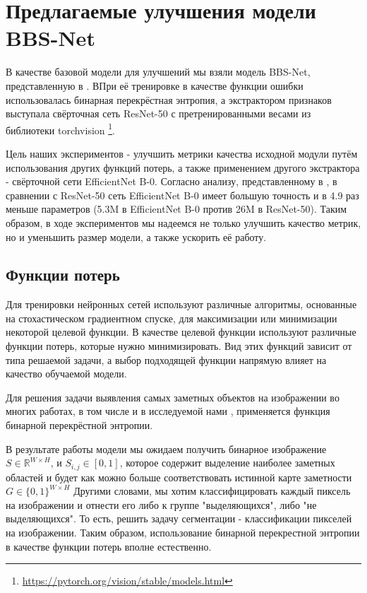 \section{Предлагаемые улучшения модели BBS-Net}

В качестве базовой модели для улучшений мы взяли модель BBS-Net, представленную в \cite{BBS}.
ВПри её тренировке в качестве функции ошибки использовалась  бинарная перекрёстная энтропия,
а экстрактором признаков выступала свёрточная сеть ResNet-50\cite{ResNet}
с претренированными весами из библиотеки torchvision \footnote{\url{https://pytorch.org/vision/stable/models.html}}.

Цель наших экспериментов - улучшить метрики качества исходной модули путём использования 
других функций потерь, а также применением другого экстрактора - свёрточной сети EfficientNet B-0\cite{Efficientnet}.
Согласно анализу, представленному в \cite{Efficientnet}, в сравнении с ResNet-50 сеть EfficientNet B-0 имеет большую точность 
и в 4.9 раз меньше параметров (5.3M в EfficientNet B-0 против 26M в ResNet-50). 
Таким образом, в ходе экспериментов мы надеемся не только улучшить качество метрик, 
но и уменьшить размер модели, а также ускорить её работу.


\subsection{Функции потерь}

Для тренировки нейронных сетей используют различные алгоритмы, основанные на стохастическом градиентном спуске,
для максимизации или минимизации некоторой целевой функции. В качестве целевой функции используют различные функции потерь, 
которые нужно минимизировать. Вид этих функций зависит от типа решаемой задачи, а выбор подходящей функции напрямую влияет на 
качество обучаемой модели. 

Для решения задачи выявления самых заметных объектов на изображении 
во многих работах, в том числе и в исследуемой нами \cite{BBS}, применяется функция бинарной перекрёстной энтропии.

В результате работы модели мы ожидаем получить бинарное изображение $S \in \mathbb{R}^{W \times H}$, и $S_{i,j} \in [0,1]$, которое содержит 
выделение наиболее заметных областей и будет как можно больше соответствовать истинной карте заметности $G \in \{0,1\}^{W \times H}$
Другими словами, мы хотим классифицировать каждый пиксель на изображении и отнести его либо к группе "выделяющихся", либо "не выделяющихся". То есть,
решить задачу сегментации - классификации пикселей на изображении. Таким образом, использование бинарной перекрестной энтропии 
в качестве функции потерь вполне естественно.

